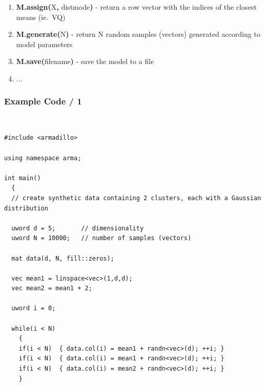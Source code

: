 \documentclass[usenames,dvipsnames]{beamer}
\def\_{{\tt\char95}}
\begin{document}
\begin{frame}
\begin{enumerate}[{~~$\boldsymbol{\bullet}$}]
\begin{enumerate}[{$\boldsymbol{\rightarrow}$}]
\item
{\bf M.assign(}X{\bf,} dist\_mode{\bf)} - return a row vector with the indices of the closest means (ie.~VQ)

\item
{\bf M.generate(}N{\bf)} - return N random samples (vectors) generated according to model parameters

\item
{\bf M.save(}filename{\bf)} - save the model to a file

\item ...

\end{enumerate}



\end{enumerate}
\end{frame}

%
%
%

\begin{frame}[fragile=singleslide]
\frametitle{Example Code / 1}

\begin{minipage}{1.00\textwidth}
\begin{minipage}{0.05\textwidth}
~
\end{minipage}
\begin{minipage}{0.90\textwidth}
\begin{Verbatim}[fontsize=\tiny]
#include <armadillo>

using namespace arma;

int main()
  {
  // create synthetic data containing 2 clusters, each with a Gaussian distribution
  
  uword d = 5;       // dimensionality
  uword N = 10000;   // number of samples (vectors)
  
  mat data(d, N, fill::zeros);
  
  vec mean1 = linspace<vec>(1,d,d);
  vec mean2 = mean1 + 2;
  
  uword i = 0;
  
  while(i < N)
    {
    if(i < N)  { data.col(i) = mean1 + randn<vec>(d); ++i; }
    if(i < N)  { data.col(i) = mean1 + randn<vec>(d); ++i; }
    if(i < N)  { data.col(i) = mean2 + randn<vec>(d); ++i; }
    }
\end{Verbatim}
\end{minipage}
\end{minipage}
\end{frame}

%
%
%
\end{document}
